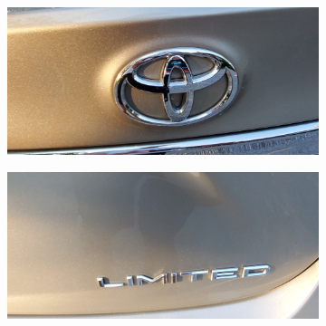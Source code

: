 \documentclass[12pt]{article}
\begin{document}
\begin{figure}[!ht]
\begin{subfigure}[b]{0.4\textwidth}
        \caption{}
    \end{subfigure}
    \begin{subfigure}[b]{0.4\textwidth}
        \centering
        \includegraphics[width=\textwidth]{images/car_photos/20210703_192836.jpg} %
        \caption{}
    \end{subfigure}
    \hspace{2 pt}
    \begin{subfigure}[b]{0.4\textwidth}
        \centering
        \includegraphics[width=\textwidth]{images/car_photos/20210703_192839.jpg} %
        \caption{}
    \end{subfigure}
    \begin{subfigure}[b]{0.4\textwidth}
        \centering

\end{subfigure}
\end{figure}
\end{document}
